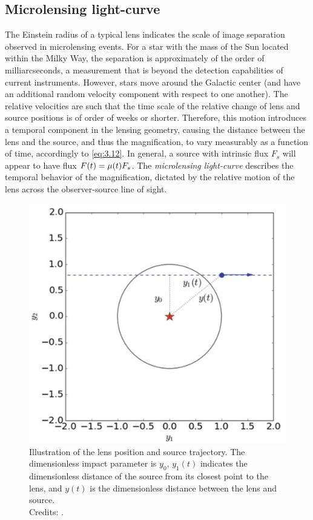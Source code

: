\subsection{Microlensing light-curve}
\label{subsec:micro_lc}
The Einstein radius of a typical lens indicates the scale of image separation observed in microlensing events. For a star with the mass of the Sun located within the Milky Way, the separation is approximately of the order of milliarcseconds, a measurement that is beyond the detection capabilities of current instruments. However, stars move around the Galactic center (and have an additional random velocity component with respect to one another). The relative velocities are such that the time scale of the relative change of lens and source positions is of order of weeks or shorter. Therefore, this motion introduces a temporal component in the lensing geometry, causing the distance between the lens and the source, and thus the magnification, to vary measurably as a function of time, accordingly to \cref{eq:3.12}. In general, a source with intrinsic flux $F_s$ will appear to have flux $F (t) = \mu (t) F_s$. 
\newpage
The \emph{microlensing light-curve} describes the temporal behavior of the magnification, dictated by the relative motion of the lens across the observer-source line of sight.

\begin{figure}
    \centering
    \includegraphics[width=0.61\linewidth, keepaspectratio]{img//chapter3/lens_source_trajectory.png}
    \caption[Lens position and source trajectory in a microlensing event]{Illustration of the lens position and source trajectory. The dimensionless impact parameter is $y_0$, $y_1 (t)$ indicates the dimensionless distance of the source from its closest point to the lens, and $y (t)$ is the dimensionless distance between the lens and source.\\\small{Credits: \cite{meneghetti_introduction_2021}.}}
    \label{fig:lens_source_trajectory}
\end{figure}

